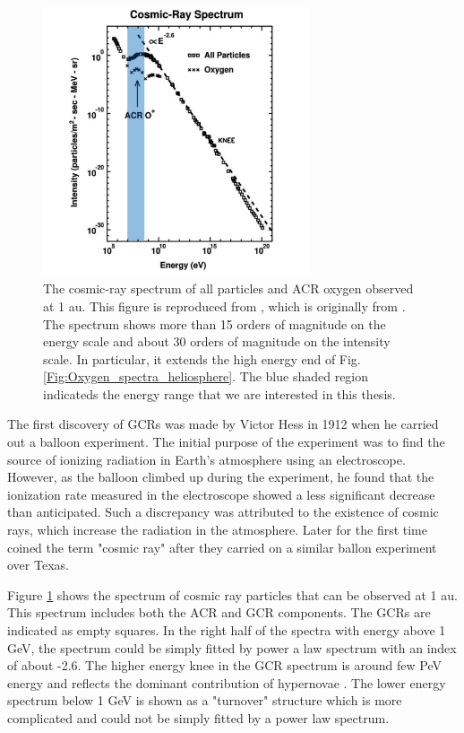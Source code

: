 \label{Sec:GCR}
\begin{figure}[htb]
    \centering
    \includegraphics[width = 0.7\textwidth]{images/gcr_spectra_shadow.png}
    \caption[The cosmic-ray spectrum of all particles at 1 au]{The cosmic-ray spectrum of all particles and \ac{ACR} oxygen observed at 1 au. This figure is reproduced from \citet{Giacalone2022SSRv, Giacalone2012SSRv}, which is originally from \citet{Jokipii1990AIPC}.
    The spectrum shows more than 15 orders of magnitude on the energy scale and about 30 orders of magnitude on the intensity scale. In particular, it extends the high energy end of Fig.\ref{Fig:Oxygen_spectra_heliosphere}. The blue shaded region indicateds the energy range that we are interested in this thesis.}
    \label{Fig:Oxygen_spectra_cosmic_ray}
\end{figure}
The first discovery of \acp{GCR} was made by Victor Hess in 1912 when he carried out a balloon experiment. The initial purpose of the experiment was to find the source of ionizing radiation in Earth's atmosphere using an electroscope. However, as the balloon climbed up during the experiment, he found that the ionization rate measured in the electroscope showed a less significant decrease than anticipated. Such a discrepancy was attributed to the existence of cosmic rays, which increase the radiation in the atmosphere. Later \citet{Millikan1928TheOrigin} for the first time coined the term "cosmic ray" after they carried on a similar ballon experiment over Texas.

Figure \ref{Fig:Oxygen_spectra_cosmic_ray} shows the spectrum of cosmic ray particles that can be observed at 1 au. This spectrum includes both the \ac{ACR} and \ac{GCR} components. The \acp{GCR} are indicated as empty squares. In the right half of the spectra with energy above 1 GeV, the spectrum could be simply fitted by power a law spectrum with an index of about -2.6. The higher energy knee in the \ac{GCR} spectrum is around few PeV energy and reflects the dominant contribution of hypernovae \citep{Sveshnikova2003AA, Hoerandel2003APh}. The lower energy spectrum below 1 GeV is shown as a "turnover" structure which is more complicated and could not be simply fitted by a power law spectrum. 

